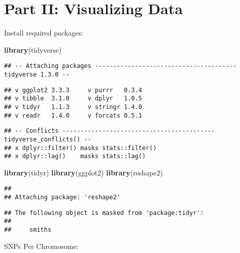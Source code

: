 \documentclass[
]{article}
\newenvironment{Shaded}{\begin{snugshade}}{\end{snugshade}}
\newcommand{\KeywordTok}[1]{\textcolor[rgb]{0.13,0.29,0.53}{\textbf{#1}}}
\newcommand{\NormalTok}[1]{#1}
\begin{document}
\hypertarget{part-ii-visualizing-data}{%
\section{Part II: Visualizing Data}\label{part-ii-visualizing-data}}

Install required packages:

\begin{Shaded}
\begin{Highlighting}[]
\KeywordTok{library}\NormalTok{(tidyverse)}
\end{Highlighting}
\end{Shaded}

\begin{verbatim}
## -- Attaching packages --------------------------------------- tidyverse 1.3.0 --
\end{verbatim}

\begin{verbatim}
## v ggplot2 3.3.3     v purrr   0.3.4
## v tibble  3.1.0     v dplyr   1.0.5
## v tidyr   1.1.3     v stringr 1.4.0
## v readr   1.4.0     v forcats 0.5.1
\end{verbatim}

\begin{verbatim}
## -- Conflicts ------------------------------------------ tidyverse_conflicts() --
## x dplyr::filter() masks stats::filter()
## x dplyr::lag()    masks stats::lag()
\end{verbatim}

\begin{Shaded}
\begin{Highlighting}[]
\KeywordTok{library}\NormalTok{(tidyr)}
\KeywordTok{library}\NormalTok{(ggplot2)}
\KeywordTok{library}\NormalTok{(reshape2)}
\end{Highlighting}
\end{Shaded}

\begin{verbatim}
## 
## Attaching package: 'reshape2'
\end{verbatim}

\begin{verbatim}
## The following object is masked from 'package:tidyr':
## 
##     smiths
\end{verbatim}

SNPs Per Chromosome:
\end{document}
